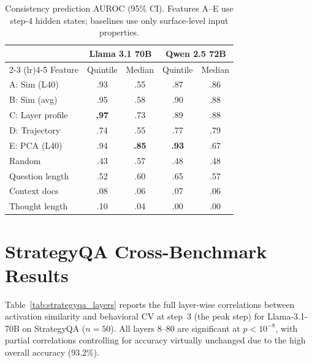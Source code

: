 \documentclass{article}
\begin{document}
\begin{table}[ht]
\caption{Consistency prediction AUROC (95\% CI). Features A--E use step-4 hidden states; baselines use only surface-level input properties.}
\label{tab:runtime_full}
\centering
\small
\begin{tabular}{lcccc}
\toprule
 & \multicolumn{2}{c}{Llama 3.1 70B} & \multicolumn{2}{c}{Qwen 2.5 72B} \\
\cmidrule(lr){2-3} \cmidrule(lr){4-5}
Feature & Quintile & Median & Quintile & Median \\
\midrule
A: Sim (L40) & .93 & .55 & .87 & .86 \\
B: Sim (avg) & .95 & .58 & .90 & .88 \\
C: Layer profile & \textbf{.97} & .73 & .89 & .88 \\
D: Trajectory & .74 & .55 & .77 & .79 \\
E: PCA (L40) & .94 & \textbf{.85} & \textbf{.93} & .67 \\
\midrule
Random & .43 & .57 & .48 & .48 \\
Question length & .52 & .60 & .65 & .57 \\
Context docs & .08 & .06 & .07 & .06 \\
Thought length & .10 & .04 & .00 & .00 \\
\bottomrule
\end{tabular}
\end{table}

\section{StrategyQA Cross-Benchmark Results}
\label{app:strategyqa}

Table~\ref{tab:strategyqa_layers} reports the full layer-wise correlations between activation similarity and behavioral CV at step~3 (the peak step) for Llama-3.1-70B on StrategyQA ($n{=}50$). All layers 8--80 are significant at $p < 10^{-8}$, with partial correlations controlling for accuracy virtually unchanged due to the high overall accuracy (93.2\%).
\end{document}
